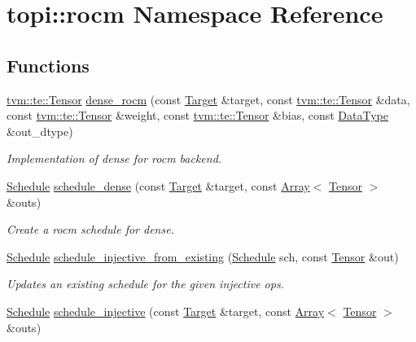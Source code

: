\hypertarget{namespacetopi_1_1rocm}{}\section{topi\+:\+:rocm Namespace Reference}
\label{namespacetopi_1_1rocm}
\subsection*{Functions}
\begin{DoxyCompactItemize}
\item 
\hyperlink{classtvm_1_1te_1_1Tensor}{tvm\+::te\+::\+Tensor} \hyperlink{namespacetopi_1_1rocm_ad31d98789d966de421bb57809fbeb8eb}{dense\+\_\+rocm} (const \hyperlink{classtvm_1_1Target}{Target} \&target, const \hyperlink{classtvm_1_1te_1_1Tensor}{tvm\+::te\+::\+Tensor} \&data, const \hyperlink{classtvm_1_1te_1_1Tensor}{tvm\+::te\+::\+Tensor} \&weight, const \hyperlink{classtvm_1_1te_1_1Tensor}{tvm\+::te\+::\+Tensor} \&bias, const \hyperlink{namespacetvm_a41918af1a1dc386388639a9d3ad06c5d}{Data\+Type} \&out\+\_\+dtype)
\begin{DoxyCompactList}\small\item\em Implementation of dense for rocm backend. \end{DoxyCompactList}\item 
\hyperlink{classtvm_1_1te_1_1Schedule}{Schedule} \hyperlink{namespacetopi_1_1rocm_a3edc082fa687a728d2a00dbf32784c8e}{schedule\+\_\+dense} (const \hyperlink{classtvm_1_1Target}{Target} \&target, const \hyperlink{classtvm_1_1Array}{Array}$<$ \hyperlink{classtvm_1_1te_1_1Tensor}{Tensor} $>$ \&outs)
\begin{DoxyCompactList}\small\item\em Create a rocm schedule for dense. \end{DoxyCompactList}\item 
\hyperlink{classtvm_1_1te_1_1Schedule}{Schedule} \hyperlink{namespacetopi_1_1rocm_a7fc2bb96c7301c539e00ef6d6a4c034c}{schedule\+\_\+injective\+\_\+from\+\_\+existing} (\hyperlink{classtvm_1_1te_1_1Schedule}{Schedule} sch, const \hyperlink{classtvm_1_1te_1_1Tensor}{Tensor} \&out)
\begin{DoxyCompactList}\small\item\em Updates an existing schedule for the given injective ops. \end{DoxyCompactList}\item 
\hyperlink{classtvm_1_1te_1_1Schedule}{Schedule} \hyperlink{namespacetopi_1_1rocm_accc2eeb3de7b1e472e1415881007720b}{schedule\+\_\+injective} (const \hyperlink{classtvm_1_1Target}{Target} \&target, const \hyperlink{classtvm_1_1Array}{Array}$<$ \hyperlink{classtvm_1_1te_1_1Tensor}{Tensor} $>$ \&outs)

\end{DoxyCompactItemize}
